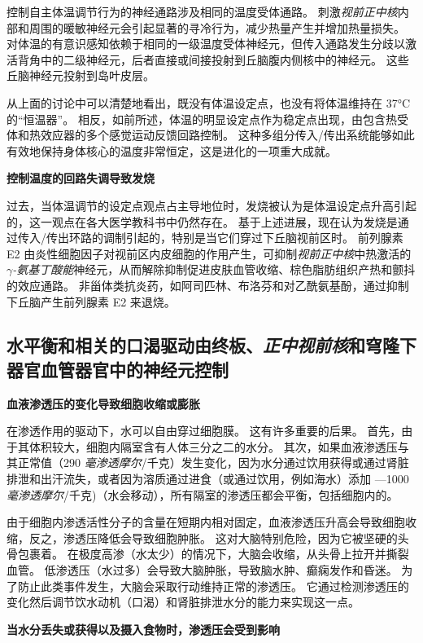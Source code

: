 控制自主体温调节行为的神经通路涉及相同的温度受体通路。
刺激\textit{视前正中核}内部和周围的暖敏神经元会引起显著的寻冷行为，减少热量产生并增加热量损失。
对体温的有意识感知依赖于相同的一级温度受体神经元，但传入通路发生分歧以激活背角中的二级神经元，后者直接或间接投射到丘脑腹内侧核中的神经元。
这些丘脑神经元投射到岛叶皮层。


从上面的讨论中可以清楚地看出，既没有体温设定点，也没有将体温维持在 37°C 的“恒温器”。
相反，如前所述，体温的明显设定点作为稳定点出现，由包含热受体和热效应器的多个感觉运动反馈回路控制。
这种多组分传入/传出系统能够如此有效地保持身体核心的温度非常恒定，这是进化的一项重大成就。


\textbf{控制温度的回路失调导致发烧}

过去，当体温调节的设定点观点占主导地位时，发烧被认为是体温设定点升高引起的，这一观点在各大医学教科书中仍然存在。
基于上述进展，现在认为发烧是通过传入/传出环路的调制引起的，特别是当它们穿过下丘脑视前区时。
前列腺素 E2 由炎性细胞因子对视前区内皮细胞的作用产生，可抑制\textit{视前正中核}中热激活的\textit{$\gamma$-氨基丁酸能}神经元，从而解除抑制促进皮肤血管收缩、棕色脂肪组织产热和颤抖的效应通路。
非甾体类抗炎药，如阿司匹林、布洛芬和对乙酰氨基酚，通过抑制下丘脑产生前列腺素 E2 来退烧。



\subsection{水平衡和相关的口渴驱动由终板、\textit{正中视前核}和穹隆下器官血管器官中的神经元控制}

\textbf{血液渗透压的变化导致细胞收缩或膨胀}

在渗透作用的驱动下，水可以自由穿过细胞膜。
这有许多重要的后果。
首先，由于其体积较大，细胞内隔室含有人体三分之二的水分。
其次，如果血液渗透压与其正常值（290 \textit{毫渗透摩尔}/千克）发生变化，因为水分通过饮用获得或通过肾脏排泄和出汗流失，或者因为溶质通过进食（或通过饮用，例如海水）添加 —1000 \textit{毫渗透摩尔}/千克)（水会移动），所有隔室的渗透压都会平衡，包括细胞内的。


由于细胞内渗透活性分子的含量在短期内相对固定，血液渗透压升高会导致细胞收缩，反之，渗透压降低会导致细胞肿胀。
这对大脑特别危险，因为它被坚硬的头骨包裹着。
在极度高渗（水太少）的情况下，大脑会收缩，从头骨上拉开并撕裂血管。
低渗透压（水过多）会导致大脑肿胀，导致脑水肿、癫痫发作和昏迷。
为了防止此类事件发生，大脑会采取行动维持正常的渗透压。
它通过检测渗透压的变化然后调节饮水动机（口渴）和肾脏排泄水分的能力来实现这一点。


\textbf{当水分丢失或获得以及摄入食物时，渗透压会受到影响}

